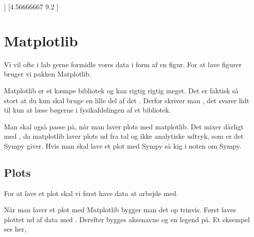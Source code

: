 \documentclass[letterpaper,10pt,english]{jupyterBook}
\begin{document}
\begin{sphinxVerbatim}[commandchars=\\\{\}]
[[ 1.2  2.5]
 [ 5.  10.3]
 [ 7.5 14.8]]
[4.56666667 9.2       ]
\end{sphinxVerbatim}


\section{Matplotlib}
\label{\detokenize{notebooks/MekRel/Matplotlib_pyplot:matplotlib}}\label{\detokenize{notebooks/MekRel/Matplotlib_pyplot::doc}}
Vi vil ofte i lab gerne formidle vores data i form af en figur. For at lave figurer bruger vi pakken Matplotlib.

Matplotlib er et kæmpe bibliotek og kan rigtig rigtig meget. Det er faktisk så stort at du kun skal bruge en lille del af det . Derfor skriver man , det svarer lidt til kun at læse bøgerne i fysikafdelingen af et bibliotek.

Man skal også passe på, når man laver plots med matplotlib. Det mixer dårligt med , da matplotlib laver plots ud fra tal og ikke analytiske udtryk, som er det Sympy giver. Hvis man skal lave et plot med Sympy så kig i noten om Sympy.


\subsection{Plots}
\label{\detokenize{notebooks/MekRel/Matplotlib_pyplot:plots}}
For at lave et plot skal vi først have data at arbejde med.

\begin{sphinxVerbatim}[commandchars=\\\{\}]
   
  \PYG{p}{[}\PYG{p}{]}
  \PYG{p}{[}\PYG{p}{]}
\end{sphinxVerbatim}

Når man laver et plot med Matplotlib bygger man det op trinvis. Først laves plottet ud af data med . Derefter bygges aksenavne og en legend på. Et eksempel ses her,
\end{document}
